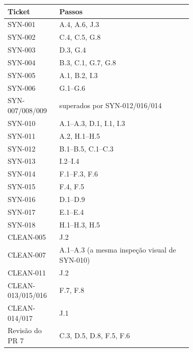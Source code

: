 \documentclass[11pt,a4paper]{article}
\begin{document}
\begin{longtable}{@{}lp{0.72\linewidth}@{}}
\toprule
Ticket & Passos \\
\midrule
SYN-001 & A.4, A.6, J.3 \\
SYN-002 & C.4, C.5, G.8 \\
SYN-003 & D.3, G.4 \\
SYN-004 & B.3, C.1, G.7, G.8 \\
SYN-005 & A.1, B.2, I.3 \\
SYN-006 & G.1--G.6 \\
SYN-007/008/009 & superados por SYN-012/016/014 \\
SYN-010 & A.1--A.3, D.1, I.1, I.3 \\
SYN-011 & A.2, H.1--H.5 \\
SYN-012 & B.1--B.5, C.1--C.3 \\
SYN-013 & I.2--I.4 \\
SYN-014 & F.1--F.3, F.6 \\
SYN-015 & F.4, F.5 \\
SYN-016 & D.1--D.9 \\
SYN-017 & E.1--E.4 \\
SYN-018 & H.1--H.3, H.5 \\
CLEAN-005 & J.2 \\
CLEAN-007 & A.1--A.3 (a mesma inspeção visual de SYN-010) \\
CLEAN-011 & J.2 \\
CLEAN-013/015/016 & F.7, F.8 \\
CLEAN-014/017 & J.1 \\
Revisão do PR 7 & C.3, D.5, D.8, F.5, F.6 \\
\bottomrule
\end{longtable}
\end{document}

